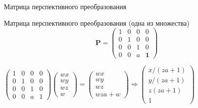\documentclass[10pt]{beamer}
\begin{document}
  
  	\begin{frame}{Матрица перспективного преобразования}
  	\begin{block}{Матрица перспективного преобразования (одна из множества)}
  		$$\mathbf P=\begin{pmatrix}
  			1&0&0&0\\
  			0&1&0&0\\
  			0&0&1&0\\
  			0&0&a&\mathbf{1}
  		\end{pmatrix}$$
  	\end{block}
  	
  	$
  	\begin{pmatrix}
  		1&0&0&0\\
  		0&1&0&0\\
  		0&0&1&0\\
  		0&0&a&1
  	\end{pmatrix}
  	\begin{pmatrix}
  		wx\\
  		wy\\
  		wz\\
  		w
  	\end{pmatrix}
  	=
  	\begin{pmatrix}
  		wx\\
  		wy\\
  		wz\\
  		wza+w
  	\end{pmatrix}
  	\Rightarrow
  	\begin{pmatrix}
  		x / (za+1) \\
  		y / (za+1) \\
  		z  (za + 1) \\
  		1
  	\end{pmatrix}
  	$
  	
  \end{frame}
  
\end{document}
